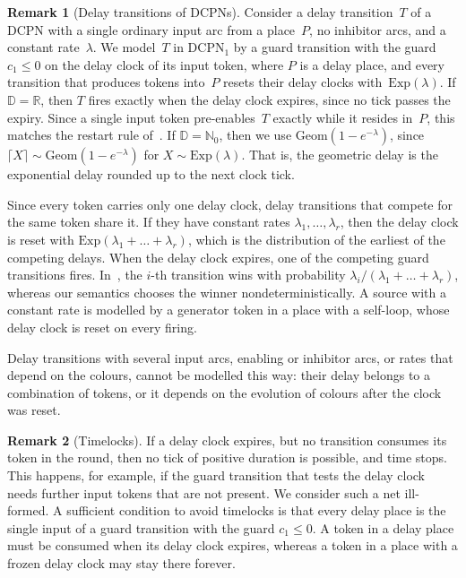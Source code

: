\documentclass[11pt]{article}
\theoremstyle{definition}
\newcommand{\NatZero}{\mathbb{N}_0}
\newcommand{\Real}{\mathbb{R}}
\newcommand{\Dom}{\mathbb{D}}
\newcommand{\DCPN}[1]{\texorpdfstring{\textup{DCPN}\ensuremath{_{#1}}}{DCPN#1}}
\newtheorem{remark}{Remark}
\begin{document}
\begin{remark}[Delay transitions of DCPNs]\label{rem:delay}
  Consider a delay transition~$T$ of a DCPN with a single ordinary input arc
  from a place~$P$, no inhibitor arcs, and a constant rate~$\lambda$. We
  model~$T$ in \DCPN{1} by a guard transition with the guard $c_1 \le 0$ on
  the delay clock of its input token, where $P$ is a delay place, and every
  transition that produces tokens into~$P$ resets their delay clocks
  with~$\mathrm{Exp}(\lambda)$. If
  $\Dom = \Real$, then $T$ fires exactly when the delay clock expires, since
  no tick passes the expiry. Since a single input token pre-enables~$T$
  exactly while it resides in~$P$, this matches the restart rule
  of~\cite{EverdijBlom2005}. If $\Dom = \NatZero$, then we use
  $\mathrm{Geom}(1 - e^{-\lambda})$, since
  $\lceil X \rceil \sim \mathrm{Geom}(1 - e^{-\lambda})$ for
  $X \sim \mathrm{Exp}(\lambda)$. That is, the geometric delay is the
  exponential delay rounded up to the next clock tick.

  Since every token carries only one delay clock, delay transitions that
  compete for the same token share it. If they have constant rates
  $\lambda_1, \dots, \lambda_r$, then the delay clock is reset with
  $\mathrm{Exp}(\lambda_1 + \dots + \lambda_r)$, which is the distribution of
  the earliest of the competing delays. When the delay clock expires, one of
  the competing guard transitions fires. In~\cite{EverdijBlom2005}, the
  $i$-th transition wins with probability
  $\lambda_i / (\lambda_1 + \dots + \lambda_r)$, whereas our semantics
  chooses the winner nondeterministically. A source with a constant rate is
  modelled by a generator token in a place with a self-loop, whose delay
  clock is reset on every firing.

  Delay transitions with several input arcs, enabling or inhibitor arcs, or
  rates that depend on the colours, cannot be modelled this way: their delay
  belongs to a combination of tokens, or it depends on the evolution of
  colours after the clock was reset.
\end{remark}

\begin{remark}[Timelocks]\label{rem:timelock}
  If a delay clock expires, but no transition consumes its token in the
  round, then no tick of positive duration is possible, and time stops. This
  happens, for example, if the guard transition that tests the delay clock
  needs further input tokens that are not present. We consider such a net
  ill-formed. A sufficient condition to avoid timelocks is that every delay
  place is the single input of a guard transition with the guard
  $c_1 \le 0$. A token in a delay place must be consumed when its delay
  clock expires, whereas a token in a place with a frozen delay clock may
  stay there forever.
\end{remark}
\end{document}
